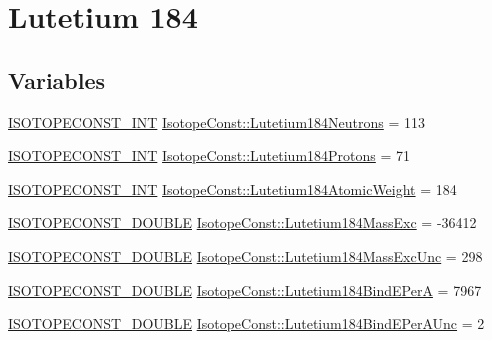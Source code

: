 \hypertarget{group___isotope_const-_lutetium-_lu184}{}\section{Lutetium 184}
\label{group___isotope_const-_lutetium-_lu184}
\subsection*{Variables}
\begin{DoxyCompactItemize}
\item 
\mbox{\hyperlink{group___isotope_const-_macros_ga5f18360b3e99483a35c32d789e62621c}{I\+S\+O\+T\+O\+P\+E\+C\+O\+N\+S\+T\+\_\+\+I\+NT}} \mbox{\hyperlink{group___isotope_const-_lutetium-_lu184_gaf64b138cfb1e22ab711e43843796c369}{Isotope\+Const\+::\+Lutetium184\+Neutrons}} = 113
\item 
\mbox{\hyperlink{group___isotope_const-_macros_ga5f18360b3e99483a35c32d789e62621c}{I\+S\+O\+T\+O\+P\+E\+C\+O\+N\+S\+T\+\_\+\+I\+NT}} \mbox{\hyperlink{group___isotope_const-_lutetium-_lu184_gaf64d6a6e9abbe8d348f0675df181e5d4}{Isotope\+Const\+::\+Lutetium184\+Protons}} = 71
\item 
\mbox{\hyperlink{group___isotope_const-_macros_ga5f18360b3e99483a35c32d789e62621c}{I\+S\+O\+T\+O\+P\+E\+C\+O\+N\+S\+T\+\_\+\+I\+NT}} \mbox{\hyperlink{group___isotope_const-_lutetium-_lu184_ga394fc9fc9b8e63e9343aba95a8afba2b}{Isotope\+Const\+::\+Lutetium184\+Atomic\+Weight}} = 184
\item 
\mbox{\hyperlink{group___isotope_const-_macros_ga8f45a7272ce02c0b4c65c44636ed719a}{I\+S\+O\+T\+O\+P\+E\+C\+O\+N\+S\+T\+\_\+\+D\+O\+U\+B\+LE}} \mbox{\hyperlink{group___isotope_const-_lutetium-_lu184_gaf3507aceece29f3a489b5d31af352617}{Isotope\+Const\+::\+Lutetium184\+Mass\+Exc}} = -\/36412
\item 
\mbox{\hyperlink{group___isotope_const-_macros_ga8f45a7272ce02c0b4c65c44636ed719a}{I\+S\+O\+T\+O\+P\+E\+C\+O\+N\+S\+T\+\_\+\+D\+O\+U\+B\+LE}} \mbox{\hyperlink{group___isotope_const-_lutetium-_lu184_gaac34489bf65f3436e0d502e0ade11f4e}{Isotope\+Const\+::\+Lutetium184\+Mass\+Exc\+Unc}} = 298
\item 
\mbox{\hyperlink{group___isotope_const-_macros_ga8f45a7272ce02c0b4c65c44636ed719a}{I\+S\+O\+T\+O\+P\+E\+C\+O\+N\+S\+T\+\_\+\+D\+O\+U\+B\+LE}} \mbox{\hyperlink{group___isotope_const-_lutetium-_lu184_ga27b37b6e0df5ec3a7b08eba933bd7556}{Isotope\+Const\+::\+Lutetium184\+Bind\+E\+PerA}} = 7967
\item 
\mbox{\hyperlink{group___isotope_const-_macros_ga8f45a7272ce02c0b4c65c44636ed719a}{I\+S\+O\+T\+O\+P\+E\+C\+O\+N\+S\+T\+\_\+\+D\+O\+U\+B\+LE}} \mbox{\hyperlink{group___isotope_const-_lutetium-_lu184_ga24c283a6aa9aaacca4c6860f86662bd5}{Isotope\+Const\+::\+Lutetium184\+Bind\+E\+Per\+A\+Unc}} = 2

\end{DoxyCompactItemize}
